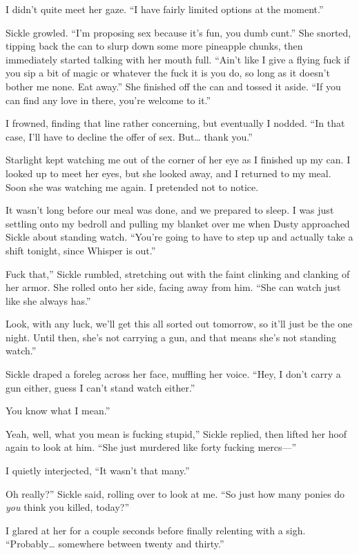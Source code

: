 I didn’t quite meet her gaze. “I have fairly limited options at the moment.”

Sickle growled. “I’m proposing sex because it’s fun, you dumb cunt.” She snorted, tipping back the can to slurp down some more pineapple chunks, then immediately started talking with her mouth full. “Ain’t like I give a flying fuck if you sip a bit of magic or whatever the fuck it is you do, so long as it doesn’t bother me none. Eat away.” She finished off the can and tossed it aside. “If you can find any love in there, you’re welcome to it.”

I frowned, finding that line rather concerning, but eventually I nodded. “In that case, I’ll have to decline the offer of sex. But… thank you.”

Starlight kept watching me out of the corner of her eye as I finished up my can. I looked up to meet her eyes, but she looked away, and I returned to my meal. Soon she was watching me again. I pretended not to notice.

It wasn’t long before our meal was done, and we prepared to sleep. I was just settling onto my bedroll and pulling my blanket over me when Dusty approached Sickle about standing watch. “You’re going to have to step up and actually take a shift tonight, since Whisper is out.”

\leavevmode{}Fuck that,” Sickle rumbled, stretching out with the faint clinking and clanking of her armor. She rolled onto her side, facing away from him. “She can watch just like she always has.”

\leavevmode{}Look, with any luck, we’ll get this all sorted out tomorrow, so it’ll just be the one night. Until then, she’s not carrying a gun, and that means she’s not standing watch.”

Sickle draped a foreleg across her face, muffling her voice. “Hey, I don’t carry a gun either, guess I can’t stand watch either.”

\leavevmode{}You know what I mean.”

\leavevmode{}Yeah, well, what you mean is fucking stupid,” Sickle replied, then lifted her hoof again to look at him. “She just murdered like forty fucking mercs—”

I quietly interjected, “It wasn’t that many.”

\leavevmode{}Oh really?” Sickle said, rolling over to look at me. “So just how many ponies do \textit{you} think you killed, today?”

I glared at her for a couple seconds before finally relenting with a sigh. “Probably… somewhere between twenty and thirty.”

